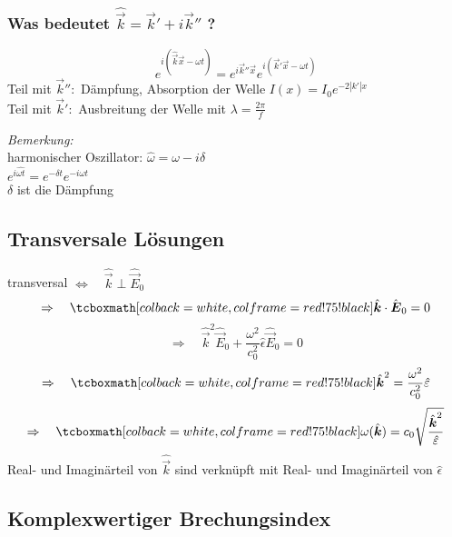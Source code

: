 \subsubsection{Was bedeutet $ \hat{\vec{k}} = \vec{k}' + i \vec{k}'' $ ?}

\begin{equation*}
e^{i(\hat{\vec{k}} \vec{x} - \omega t)} = e^{i \vec{k}'' \vec{x}} e^{i(\vec{k}' \vec{x} - \omega t)}
\end{equation*}
Teil mit $ \vec{k}'' : $ Dämpfung, Absorption der Welle $ I(x) = I_0 e^{-2 |k'| x} $\\
Teil mit $ \vec{k}' : $ Ausbreitung der Welle mit $ \lambda = \frac{2 \pi}{f} $


\noindent
\emph{Bemerkung:}\\
harmonischer Oszillator: $ \hat{\omega} = \omega - i \delta $\\
$ e^{i\hat{\omega t}} = e^{-\delta t} e^{-i \omega t} $\\
$ \delta $ ist die Dämpfung

\subsection{Transversale Lösungen}

transversal $ \Leftrightarrow \quad \hat{\vec{k}} \perp \hat{\vec{E}}_0 $ 
\begin{equation*}
\Rightarrow \quad \rmbox{\hat{\vec{k}} \cdot \hat{\vec{E}}_0 = 0}
\end{equation*}
\begin{equation*}
\Rightarrow \quad \hat{\vec{k}}^2 \hat{\vec{E}}_0 + \frac{\omega^2}{c_0^2} \hat{\epsilon} \hat{\vec{E}}_0 = 0
\end{equation*}
\begin{equation*}
\Rightarrow \quad \rmbox{\hat{\vec{k}}^2 = \frac{\omega^2}{c_0^2} \hat{\epsilon}}
\end{equation*}
\begin{equation*}
\Rightarrow \quad \rmbox{\omega(\hat{\vec{k}}) = c_0 \sqrt{\frac{\hat{\vec{k}}^2}{\hat{\epsilon}}}}
\end{equation*}
Real- und Imaginärteil von $ \hat{\vec{k}} $ sind verknüpft mit Real- und Imaginärteil von $ \hat{\epsilon} $

\subsection{Komplexwertiger Brechungsindex}

